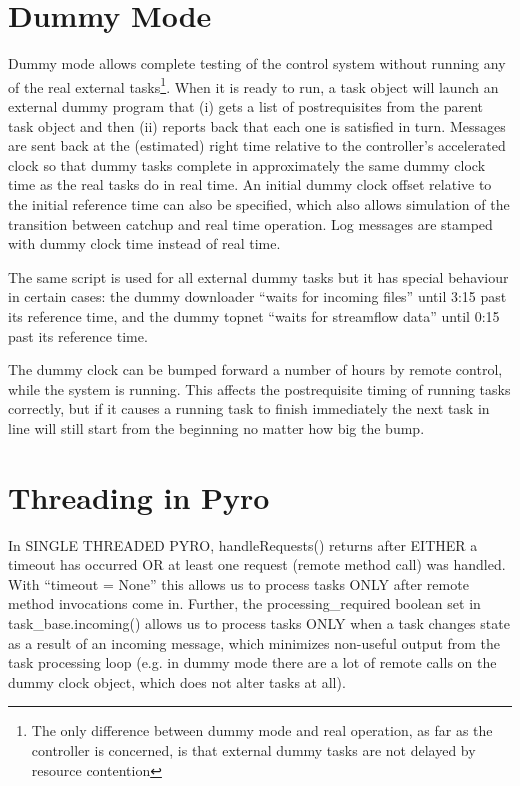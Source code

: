 \documentclass[a4paper,12pt]{amsart}
\begin{document}
\appendix

\section{Dummy Mode}

Dummy mode allows complete testing of the control system without running
any of the real external tasks\footnote{The only difference between
dummy mode and real operation, as far as the controller is concerned, is
that external dummy tasks are not delayed by resource contention}.  When
it is ready to run, a task object will launch an external dummy program
that (i) gets a list of postrequisites from the parent task object and
then (ii) reports back that each one is satisfied in turn.  Messages are
sent back at the (estimated) right time relative to the controller's
accelerated clock so that dummy tasks complete in approximately the same
dummy clock time as the real tasks do in real time. An initial dummy
clock offset relative to the initial reference time can also be
specified, which also allows simulation of the transition between
catchup and real time operation. Log messages are stamped with dummy
clock time instead of real time.

The same script is used for all external dummy tasks but it has special
behaviour in certain cases: the dummy downloader ``waits for incoming
files'' until 3:15 past its reference time, and the dummy topnet ``waits
for streamflow data'' until 0:15 past its reference time.

The dummy clock can be bumped forward a number of hours by remote
control, while the system is running. This affects the postrequisite
timing of running tasks correctly, but if it causes a running task to
finish immediately the next task in line will still start from the
beginning no matter how big the bump.


\section{Threading in Pyro}

In SINGLE THREADED PYRO, handleRequests() returns after EITHER a timeout has
occurred OR at least one request (remote method call) was handled.  With
``timeout = None'' this allows us to process tasks ONLY after remote method
invocations come in. Further, the processing\_required boolean set in
task\_base.incoming() allows us to process tasks ONLY when a task changes state
as a result of an incoming message, which minimizes non-useful output from the
task processing loop (e.g. in dummy mode there are a lot of remote calls on
the dummy clock object, which does not alter tasks at all). 
\end{document}
